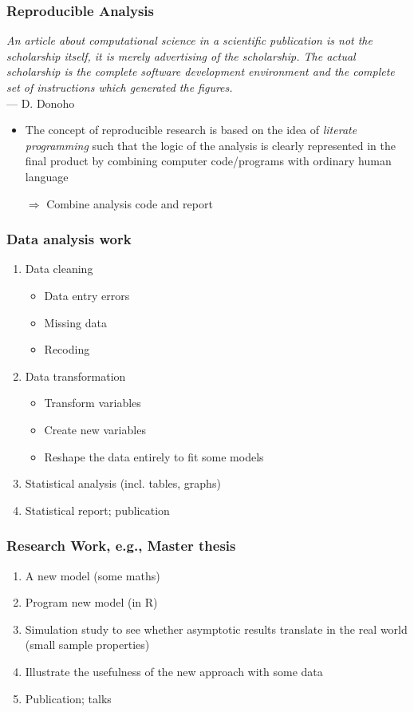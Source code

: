 \documentclass[paper=screen,mathserif]{beamer}\usepackage[]{graphicx}\usepackage[]{color}
\begin{document}
\begin{frame}
  \frametitle{Reproducible Analysis}
  {\em An article about computational science in a scientific
    publication is not the scholarship itself, it is merely advertising
    of the scholarship. The actual scholarship is the complete software
    development environment and the complete set of instructions which
    generated the figures.}\\
  --- D. Donoho
  
  \begin{itemize}
  \item The concept of reproducible research is based on the idea of
    {\em literate programming} such that the logic of the analysis is
    clearly represented in the final product by combining computer
    code/programs with ordinary human language
    
    $\Rightarrow$ Combine analysis code and report
  \end{itemize}
\end{frame}


\begin{frame}
  \frametitle{Data analysis work}
  \begin{enumerate}
  \item Data cleaning
    \begin{itemize}
    \item Data entry errors
    \item Missing data
    \item Recoding
    \end{itemize}
  \item Data transformation
    \begin{itemize}
    \item Transform variables
    \item Create new variables
    \item Reshape the data entirely to fit some models
    \end{itemize}
  \item Statistical analysis (incl. tables, graphs)
  \item Statistical report; publication
  \end{enumerate}
\end{frame}

\begin{frame}
  \frametitle{Research Work, e.g., Master thesis}
  \begin{enumerate}
  \item A new model (some maths)
  \item Program new model (in R)
  \item Simulation study to see whether asymptotic results translate
    in the real world (small sample properties)
  \item Illustrate the usefulness of the new approach with some data
  \item Publication; talks
  \end{enumerate}
\end{frame}
\end{document}
